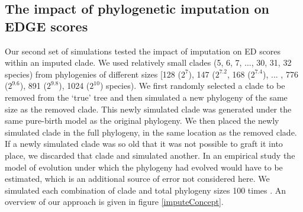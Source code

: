 \documentclass[10pt,english]{article}
\begin{document}
\subsection*{The impact of phylogenetic imputation on EDGE scores}
Our second set of simulations tested the impact of imputation on ED scores
within an imputed clade. We used relatively small clades (5, 6, 7, ..., 30, 31,
32 species) from phylogenies of different sizes [128 ($2^7$), 147 ($2^{7.2}$,
168 ($2^{7.4}$), ... , 776 ($2^{9.6}$), 891 ($2^{9.8}$), 1024 ($2^{10}$)
species). We first randomly selected a clade to be removed from the ‘true' tree
and then simulated a new phylogeny of the same size as the removed clade. This
newly simulated clade was generated under the same pure-birth model as the
original phylogeny. We then placed the newly simulated clade in the full
phylogeny, in the same location as the removed clade. If a newly simulated clade
was so old that it was not possible to graft it into place, we discarded that
clade and simulated another. In an empirical study the model of evolution under
which the phylogeny had evolved would have to be estimated, which is an
additional source of error not considered here. We simulated each combination of
clade and total phylogeny sizes 100 times . An
overview of our approach is given in figure \ref{imputeConcept}. 
\end{document}
